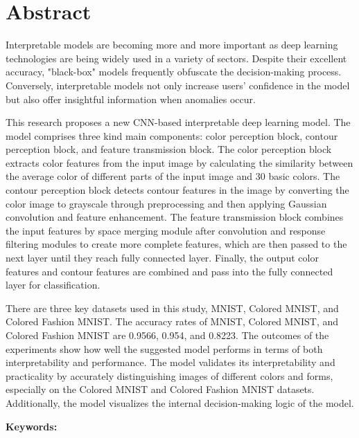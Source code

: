 \documentclass[class=NCU_thesis, crop=false]{standalone}
\begin{document}
\chapter{Abstract}

Interpretable models are becoming more and more important as deep learning technologies are being widely used in a variety of sectors.
Despite their excellent accuracy, "black-box" models frequently obfuscate the decision-making process. 
Conversely, interpretable models not only increase users' confidence in the model but also offer insightful information when anomalies occur.

This research proposes a new CNN-based interpretable deep learning model. 
The model comprises three kind main components: color perception block, contour perception block, and feature transmission block. 
The color perception block extracts color features from the input image by calculating the similarity between the average color of different parts of the input image and 30 basic colors. 
The contour perception block detects contour features in the image by converting the color image to grayscale through preprocessing and then applying Gaussian convolution and feature enhancement. 
The feature transmission block combines the input features by space merging module after convolution and response filtering modules to create more complete features, which are then passed to the next layer until they reach fully connected layer. 
Finally, the output color features and contour features are combined and pass into the fully connected layer for classification.

There are three key datasets used in this study, MNIST, Colored MNIST, and Colored Fashion MNIST. 
The accuracy rates of MNIST, Colored MNIST, and Colored Fashion MNIST are 0.9566, 0.954, and 0.8223.
The outcomes of the experiments show how well the suggested model performs in terms of both interpretability and performance. 
The model validates its interpretability and practicality by accurately distinguishing images of different colors and forms, especially on the Colored MNIST and Colored Fashion MNIST datasets. Additionally, the model visualizes the internal decision-making logic of the model.

\vspace{2em}
\noindent \textbf{Keywords:} \keywordsEn{} %
\end{document}
